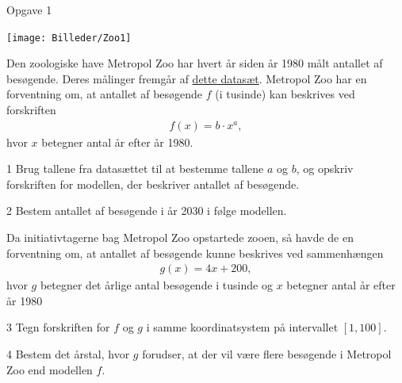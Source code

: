 \documentclass[12pt,x11names,a4paper]{article}
\begin{document}
\begin{opgavetekst}{Opgave 1}
	\begin{center}
		\texttt{[image: Billeder/Zoo1]}
	\end{center}
	Den zoologiske have Metropol Zoo har hvert år siden år 1980 målt antallet af besøgende. Deres målinger 
	fremgår af \href{https://github.com/ChristianJLex/TeachingNotes/raw/master/2023-2024/Data og lign/BesoegendeiZoo.xlsx}{\color{blue!60} dette datasæt}.
	Metropol Zoo har en forventning om, at antallet af besøgende $f$ (i tusinde) kan
	beskrives ved forskriften
	\begin{align*}
		f(x) = b\cdot x^a,
	\end{align*}
	hvor $x$ betegner antal år efter år 1980.
\end{opgavetekst}


\begin{delopgave}{}{1}
	Brug tallene fra datasættet til at bestemme tallene $a$ og $b$, og opskriv forskriften for 
	modellen, der beskriver antallet af besøgende.
\end{delopgave}
\begin{delopgave}{}{2}
	Bestem antallet af besøgende i år 2030 i følge modellen. 
\end{delopgave}
\begin{meretekst}
	Da initiativtagerne bag Metropol Zoo opstartede zooen, så havde de en forventning
	om, at antallet af besøgende kunne beskrives ved sammenhængen
	\begin{align*}
		g(x) = 4x + 200,
	\end{align*}
	hvor $g$ betegner det årlige antal besøgende i tusinde og $x$ betegner antal år efter år 
	1980
\end{meretekst}
\begin{delopgave}{}{3}
	Tegn forskriften for $f$ og $g$ i samme koordinatsystem på intervallet $[1,100]$. 
\end{delopgave}
\begin{delopgave}{}{4}
	Bestem det årstal, hvor $g$ forudser, at der vil være flere besøgende i Metropol Zoo end
	modellen $f$.
\end{delopgave}
\end{document}
